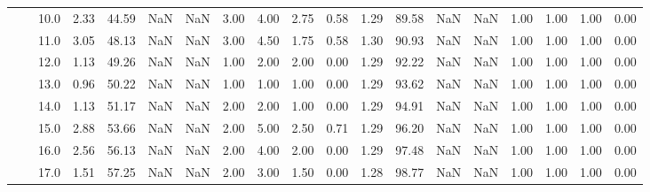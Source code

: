 \begin{tabular}{lllrrrrrrrrrrrrrrrr}
          &     & 10.0 &      2.33 &      44.59 &               NaN &                NaN &  3.00 &   4.00 &             2.75 &                         0.58 &      1.29 &      89.58 &               NaN &                NaN &  1.00 &   1.00 &             1.00 &                         0.00 \\
          &     & 11.0 &      3.05 &      48.13 &               NaN &                NaN &  3.00 &   4.50 &             1.75 &                         0.58 &      1.30 &      90.93 &               NaN &                NaN &  1.00 &   1.00 &             1.00 &                         0.00 \\
          &     & 12.0 &      1.13 &      49.26 &               NaN &                NaN &  1.00 &   2.00 &             2.00 &                         0.00 &      1.29 &      92.22 &               NaN &                NaN &  1.00 &   1.00 &             1.00 &                         0.00 \\
          &     & 13.0 &      0.96 &      50.22 &               NaN &                NaN &  1.00 &   1.00 &             1.00 &                         0.00 &      1.29 &      93.62 &               NaN &                NaN &  1.00 &   1.00 &             1.00 &                         0.00 \\
          &     & 14.0 &      1.13 &      51.17 &               NaN &                NaN &  2.00 &   2.00 &             1.00 &                         0.00 &      1.29 &      94.91 &               NaN &                NaN &  1.00 &   1.00 &             1.00 &                         0.00 \\
          &     & 15.0 &      2.88 &      53.66 &               NaN &                NaN &  2.00 &   5.00 &             2.50 &                         0.71 &      1.29 &      96.20 &               NaN &                NaN &  1.00 &   1.00 &             1.00 &                         0.00 \\
          &     & 16.0 &      2.56 &      56.13 &               NaN &                NaN &  2.00 &   4.00 &             2.00 &                         0.00 &      1.29 &      97.48 &               NaN &                NaN &  1.00 &   1.00 &             1.00 &                         0.00 \\
          &     & 17.0 &      1.51 &      57.25 &               NaN &                NaN &  2.00 &   3.00 &             1.50 &                         0.00 &      1.28 &      98.77 &               NaN &                NaN &  1.00 &   1.00 &             1.00 &                         0.00 \\

\end{tabular}
